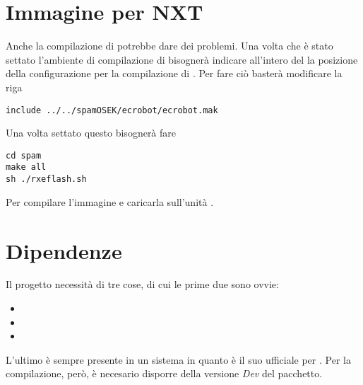 \section{Immagine per NXT}
Anche la compilazione di \nxtOSEK{} potrebbe dare dei problemi. Una volta
che è stato settato l'ambiente di compilazione di \nxtOSEK{} bisognerà
indicare all'intero del  la posizione della configurazione
per la compilazione di \nxtOSEK{}. Per fare ciò basterà modificare la riga
\begin{verbatim}
include ../../spamOSEK/ecrobot/ecrobot.mak
\end{verbatim}

Una volta settato questo bisognerà fare
\begin{verbatim}
cd spam
make all
sh ./rxeflash.sh
\end{verbatim}
Per compilare l'immagine e caricarla sull'unità .

\section{Dipendenze}
Il progetto necessità di tre cose, di cui le prime due sono ovvie:
\begin{itemize}
    \item \nxtOSEK{}
    \item \SciCosLab{}
    \item {}
\end{itemize}
L'ultimo è sempre presente in un sistema  in quanto è il suo
 ufficiale per . Per la
compilazione, però, è necesario disporre della versione \emph{Dev} del
pacchetto.

\cleardoublepage
